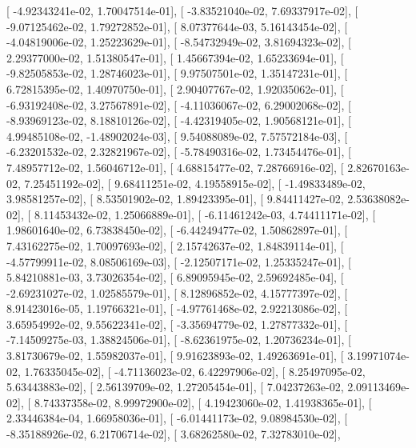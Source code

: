 \documentclass{article}
\begin{document}
       [ -4.92343241e-02,   1.70047514e-01],
       [ -3.83521040e-02,   7.69337917e-02],
       [ -9.07125462e-02,   1.79272852e-01],
       [  8.07377644e-03,   5.16143454e-02],
       [ -4.04819006e-02,   1.25223629e-01],
       [ -8.54732949e-02,   3.81694323e-02],
       [  2.29377000e-02,   1.51380547e-01],
       [  1.45667394e-02,   1.65233694e-01],
       [ -9.82505853e-02,   1.28746023e-01],
       [  9.97507501e-02,   1.35147231e-01],
       [  6.72815395e-02,   1.40970750e-01],
       [  2.90407767e-02,   1.92035062e-01],
       [ -6.93192408e-02,   3.27567891e-02],
       [ -4.11036067e-02,   6.29002068e-02],
       [ -8.93969123e-02,   8.18810126e-02],
       [ -4.42319405e-02,   1.90568121e-01],
       [  4.99485108e-02,  -1.48902024e-03],
       [  9.54088089e-02,   7.57572184e-03],
       [ -6.23201532e-02,   2.32821967e-02],
       [ -5.78490316e-02,   1.73454476e-01],
       [  7.48957712e-02,   1.56046712e-01],
       [  4.68815477e-02,   7.28766916e-02],
       [  2.82670163e-02,   7.25451192e-02],
       [  9.68411251e-02,   4.19558915e-02],
       [ -1.49833489e-02,   3.98581257e-02],
       [  8.53501902e-02,   1.89423395e-01],
       [  9.84411427e-02,   2.53638082e-02],
       [  8.11453432e-02,   1.25066889e-01],
       [ -6.11461242e-03,   4.74411171e-02],
       [  1.98601640e-02,   6.73838450e-02],
       [ -6.44249477e-02,   1.50862897e-01],
       [  7.43162275e-02,   1.70097693e-02],
       [  2.15742637e-02,   1.84839114e-01],
       [ -4.57799911e-02,   8.08506169e-03],
       [ -2.12507171e-02,   1.25335247e-01],
       [  5.84210881e-03,   3.73026354e-02],
       [  6.89095945e-02,   2.59692485e-04],
       [ -2.69231027e-02,   1.02585579e-01],
       [  8.12896852e-02,   4.15777397e-02],
       [  8.91423016e-05,   1.19766321e-01],
       [ -4.97761468e-02,   2.92213086e-02],
       [  3.65954992e-02,   9.55622341e-02],
       [ -3.35694779e-02,   1.27877332e-01],
       [ -7.14509275e-03,   1.38824506e-01],
       [ -8.62361975e-02,   1.20736234e-01],
       [  3.81730679e-02,   1.55982037e-01],
       [  9.91623893e-02,   1.49263691e-01],
       [  3.19971074e-02,   1.76335045e-02],
       [ -4.71136023e-02,   6.42297906e-02],
       [  8.25497095e-02,   5.63443883e-02],
       [  2.56139709e-02,   1.27205454e-01],
       [  7.04237263e-02,   2.09113469e-02],
       [  8.74337358e-02,   8.99972900e-02],
       [  4.19423060e-02,   1.41938365e-01],
       [  2.33446384e-04,   1.66958036e-01],
       [ -6.01441173e-02,   9.08984530e-02],
       [ -8.35188926e-02,   6.21706714e-02],
       [  3.68262580e-02,   7.32783010e-02],
\end{document}

